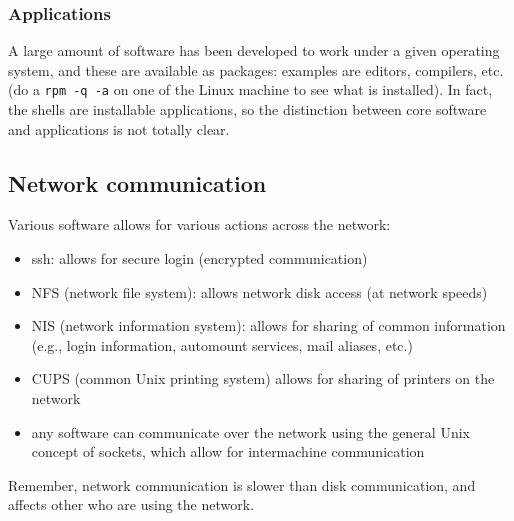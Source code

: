 \documentclass{article}
\begin{document}
\subsubsection{Applications}
A large amount of software has been developed to work under a given
operating system, and these are available as packages: examples are
editors, compilers, etc. (do a \texttt{rpm -q -a} on one of the Linux machine
to see what is installed). In fact, the shells are installable
applications, so the distinction between core software and
applications is not totally clear.

\subsection{Network communication}
Various software allows for various actions across the network:
\begin{itemize}
    \item ssh: allows for secure login (encrypted communication)
    \item NFS (network file system): allows network disk access
        (at network speeds)
    \item NIS (network information system): allows for sharing of common
        information (e.g., login information, automount services, mail
        aliases, etc.)
    \item CUPS (common Unix printing system) allows for sharing of printers on
        the network
    \item any software can communicate over the network using the general Unix
        concept of sockets, which allow for intermachine communication
\end{itemize}
Remember, network communication is slower than disk communication, and
affects other who are using the network.
\end{document}
